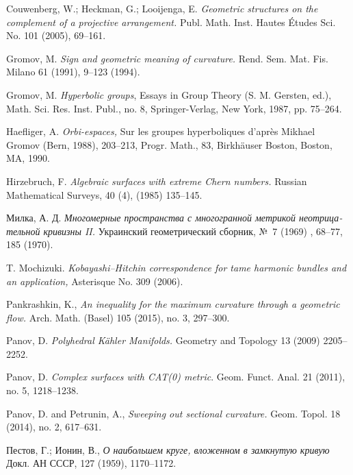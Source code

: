 \documentclass{compositio}
\begin{document}
\begin{thebibliography}{52}
 Couwenberg, W.; Heckman, G.; Looijenga, E.
\textit{Geometric structures on the complement of a projective arrangement.}
Publ. Math. Inst. Hautes \'Etudes Sci. No. 101 (2005), 69--161.

 Gromov, M. 
\textit{Sign and geometric meaning of curvature.} 
Rend. Sem. Mat. Fis. Milano 61 (1991), 9--123 (1994). 

 Gromov, M. 
\textit{Hyperbolic groups}, 
Essays in Group Theory (S. M. Gersten, ed.), Math. Sci.
Res. Inst. Publ., no. 8, Springer-Verlag, New York, 1987, pp. 75--264.

Haefliger, A.
\textit{Orbi-espaces,} 
Sur les groupes hyperboliques d'apr\`{e}s Mikhael Gromov (Bern, 1988), 203--213,
Progr. Math., 83, Birk\-h\"auser Boston, Boston, MA, 1990.

 Hirzebruch, F. 
\textit{Algebraic surfaces with extreme Chern numbers.}
Russian Mathematical Surveys, 40 (4), (1985) 135--145.

\begin{otherlanguage}{russian}
Милка, А. Д.
\textit{Многомерные пространства с многогранной метрикой неотрицательной кривизны II.}
Украинский геометрический сборник, №~7 (1969) , 68--77, 185 (1970). 
\end{otherlanguage}


 T. Mochizuki. \textit{Kobayashi--Hitchin correspondence for tame
harmonic bundles and an application,} 
Asterisque No. 309
(2006).

 Pankrashkin, K., 
\textit{An inequality for the maximum curvature through a geometric flow.} Arch. Math. (Basel) 105 (2015), no. 3, 297--300.


 Panov, D.  \textit{Polyhedral K\"ahler Manifolds.}
Geometry and Topology 13 (2009) 2205--2252.

 Panov, D. \textit{Complex surfaces with {\rm CAT(0)} metric}.
Geom. Funct. Anal. 21 (2011), no. 5, 1218--1238.

 Panov, D. and Petrunin, A., \textit{Sweeping out sectional curvature.}  Geom. Topol. 18 (2014), no. 2, 617--631.

\begin{otherlanguage}{russian}
Пестов, Г.; Ионин, В.,
\textit{О наибольшем круге, вложенном в замкнутую кривую}
Докл. АН СССР, 127 (1959), 1170--1172.
\end{otherlanguage}



\end{thebibliography}
\end{document}
